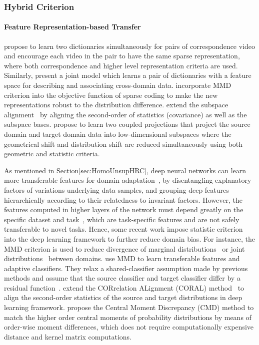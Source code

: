 \documentclass[prodmode]{acmsmall}  %
\begin{document}
\subsubsection{Hybrid Criterion}
\paragraph{Feature Representation-based Transfer} propose to learn two dictionaries simultaneously for pairs of correspondence video and encourage each video in the pair to have the same sparse representation, where both correspondence and higher level representation criteria are used. Similarly,  present a joint model which learns a pair of dictionaries with a feature space for describing and associating cross-domain data.  incorporate MMD criterion into the objective function of sparse coding to make the new representations robust to the distribution difference.  extend the subspace alignment~\cite{Fernando2013} by aligning the second-order of statistics (covariance) as well as the subspace bases.  propose to learn two coupled projections that project the source domain and target domain data into low-dimensional subspaces where the geometrical shift and distribution shift are reduced simultaneously using both geometric and statistic criteria.

As mentioned in Section\ref{sec:HomoUnsupHRC}, deep neural networks can learn more transferable features for domain adaptation~\cite{Bengio2012,Donahue2014}, by disentangling explanatory factors of variations underlying data samples, and grouping deep features hierarchically according to their relatedness to invariant factors. However, the features computed in higher layers of the network must depend greatly on the specific dataset and task~\cite{Yosinski2014}, which are task-specific features and are not safely transferable to novel tasks. Hence, some recent work impose statistic criterion into the deep learning framework to further reduce domain bias. For instance, the MMD criterion is used to reduce divergence of marginal distributions~\cite{Tzeng2014,Long2015a} or joint distributions~\cite{Long2017} between domains.  use MMD to learn transferable features and adaptive classifiers. They relax a shared-classifier assumption made by previous methods and assume that the source classifier and target classifier differ by a residual function~\cite{He2016}.  extend the CORrelation ALignment (CORAL) method~\cite{Sun2016} to align the second-order statistics of the source and target distributions in deep learning framework.  propose the Central Moment Discrepancy (CMD) method to match the higher order central moments of probability distributions by means of order-wise moment differences, which does not require computationally expensive distance and kernel matrix computations. 
\end{document}
